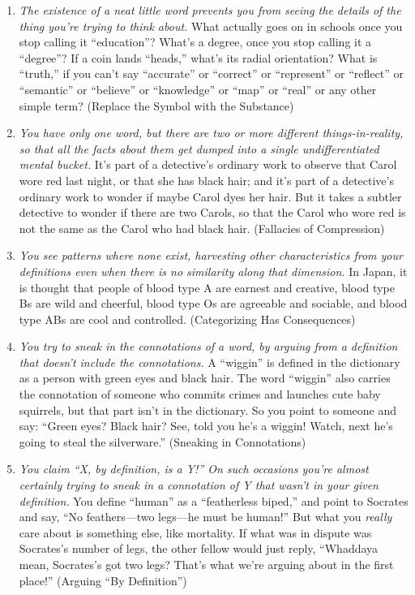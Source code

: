 \begin{enumerate}
\item {
 \textit{The existence of a neat little word prevents you from
seeing the details of the thing you're trying to think
about.} What actually goes on in schools once you stop calling it
``education''?
What's a degree, once you stop calling it a
``degree''? If a coin lands
``heads,'' what's
its radial orientation? What is
``truth,'' if you
can't say
``accurate'' or
``correct'' or
``represent'' or
``reflect'' or
``semantic'' or
``believe'' or
``knowledge'' or
``map'' or
``real'' or any other simple term?
(Replace the Symbol with the Substance)}

\item {
 \textit{You have only one word, but there are two or more
different things-in-reality, so that all the facts about them get
dumped into a single undifferentiated mental bucket.}
It's part of a detective's ordinary
work to observe that Carol wore red last night, or that she has black
hair; and it's part of a detective's
ordinary work to wonder if maybe Carol dyes her hair. But it takes a
subtler detective to wonder if there are two Carols, so that the Carol
who wore red is not the same as the Carol who had black hair.
(Fallacies of Compression)}

\item {
 \textit{You see patterns where none exist, harvesting other
characteristics from your }\textit{definitions even when there is no
similarity along that dimension.} In Japan, it is thought that people
of blood type A are earnest and creative, blood type Bs are wild and
cheerful, blood type Os are agreeable and sociable, and blood type ABs
are cool and controlled. (Categorizing Has Consequences)}

\item {
 \textit{You try to sneak in the connotations of a word, by arguing
from a definition that doesn't include the
connotations.} A ``wiggin'' is
defined in the dictionary as a person with green eyes and black hair.
The word ``wiggin'' also carries the
connotation of someone who commits crimes and launches cute baby
squirrels, but that part isn't in the dictionary. So
you point to someone and say: ``Green eyes? Black
hair? See, told you he's a wiggin! Watch, next
he's going to steal the silverware.''
(Sneaking in Connotations)}

\item {
 \textit{You claim ``X, by definition, is a
Y!'' On such occasions you're almost
certainly trying to sneak in a connotation of Y that
wasn't in your given definition.} You define
``human'' as a
``featherless biped,'' and point to
Socrates and say, ``No feathers---two legs---he must
be human!'' But what you \textit{really} care about
is something else, like mortality. If what was in dispute was
Socrates's number of legs, the other fellow would just
reply, ``Whaddaya mean, Socrates's got
two legs? That's what we're arguing
about in the first place!'' (Arguing
``By Definition'')}


\end{enumerate}
